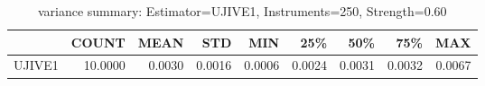 \begin{table}[ht]
\centering
\caption{variance summary: Estimator=UJIVE1, Instruments=250, Strength=0.60}
\begin{tabular}{lrrrrrrrr}
\toprule
 & COUNT & MEAN & STD & MIN & 25\% & 50\% & 75\% & MAX \\
\midrule
UJIVE1 & 10.0000 & 0.0030 & 0.0016 & 0.0006 & 0.0024 & 0.0031 & 0.0032 & 0.0067 \\
\bottomrule
\end{tabular}
\end{table}
